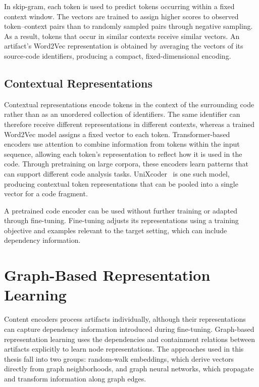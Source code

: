In skip-gram, each token is used to predict tokens occurring within a fixed context window. The vectors are trained to assign higher scores to observed token--context pairs than to randomly sampled pairs through negative sampling. As a result, tokens that occur in similar contexts receive similar vectors. An artifact’s Word2Vec representation is obtained by averaging the vectors of its source-code identifiers, producing a compact, fixed-dimensional encoding.

\subsection{Contextual Representations}

Contextual representations encode tokens in the context of the surrounding code rather than as an unordered collection of identifiers. The same identifier can therefore receive different representations in different contexts, whereas a trained Word2Vec model assigns a fixed vector to each token. Transformer-based encoders use attention to combine information from tokens within the input sequence, allowing each token’s representation to reflect how it is used in the code. Through pretraining on large corpora, these encoders learn patterns that can support different code analysis tasks. UniXcoder~\cite{unixcoder} is one such model, producing contextual token representations that can be pooled into a single vector for a code fragment.

A pretrained code encoder can be used without further training or adapted through fine-tuning. Fine-tuning adjusts its representations using a training objective and examples relevant to the target setting, which can include dependency information.

\section[Graph Representation Learning]{Graph-Based Representation Learning \label{sec:bg-gnn}}

Content encoders process artifacts individually, although their representations can capture dependency information introduced during fine-tuning. Graph-based representation learning uses the dependencies and containment relations between artifacts explicitly to learn node representations. The approaches used in this thesis fall into two groups: random-walk embeddings, which derive vectors directly from graph neighborhoods, and graph neural networks, which propagate and transform information along graph edges.

